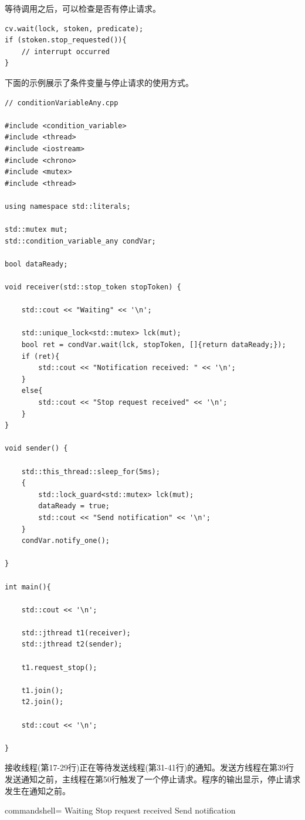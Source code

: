 等待调用之后，可以检查是否有停止请求。

\begin{lstlisting}[style=styleCXX]
cv.wait(lock, stoken, predicate);
if (stoken.stop_requested()){
	// interrupt occurred
}
\end{lstlisting}

下面的示例展示了条件变量与停止请求的使用方式。

\begin{lstlisting}[style=styleCXX]
// conditionVariableAny.cpp

#include <condition_variable>
#include <thread>
#include <iostream>
#include <chrono>
#include <mutex>
#include <thread>

using namespace std::literals;

std::mutex mut;
std::condition_variable_any condVar;

bool dataReady;

void receiver(std::stop_token stopToken) {

	std::cout << "Waiting" << '\n';
	
	std::unique_lock<std::mutex> lck(mut);
	bool ret = condVar.wait(lck, stopToken, []{return dataReady;});
	if (ret){
		std::cout << "Notification received: " << '\n';
	}
	else{
		std::cout << "Stop request received" << '\n';
	}
}

void sender() {

	std::this_thread::sleep_for(5ms);
	{
		std::lock_guard<std::mutex> lck(mut);
		dataReady = true;
		std::cout << "Send notification" << '\n';
	}
	condVar.notify_one();

}

int main(){

	std::cout << '\n';
	
	std::jthread t1(receiver);
	std::jthread t2(sender);
	
	t1.request_stop();
	
	t1.join();
	t2.join();
	
	std::cout << '\n';

}
\end{lstlisting}

接收线程(第17-29行)正在等待发送线程(第31-41行)的通知。发送方线程在第39行发送通知之前，主线程在第50行触发了一个停止请求。程序的输出显示，停止请求发生在通知之前。

\begin{tcblisting}{commandshell={}}
Waiting
Stop request received
Send notification
\end{tcblisting}

